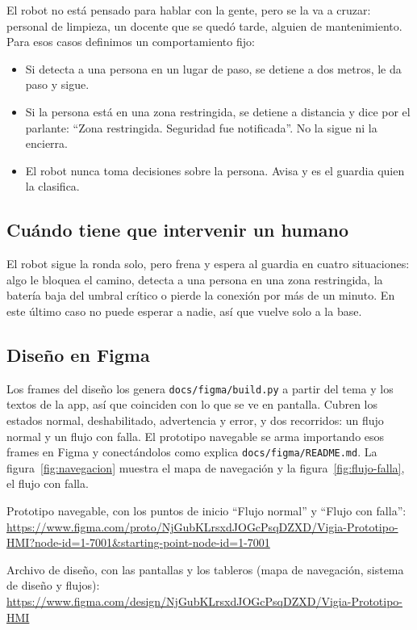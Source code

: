 El robot no está pensado para hablar con la gente, pero se la va a cruzar: personal de limpieza, un docente que se quedó tarde, alguien de mantenimiento. Para esos casos definimos un comportamiento fijo:

\begin{itemize}
  \item Si detecta a una persona en un lugar de paso, se detiene a dos metros, le da paso y sigue.
  \item Si la persona está en una zona restringida, se detiene a distancia y dice por el parlante: ``Zona restringida. Seguridad fue notificada''. No la sigue ni la encierra.
  \item El robot nunca toma decisiones sobre la persona. Avisa y es el guardia quien la clasifica.
\end{itemize}

\subsection{Cuándo tiene que intervenir un humano}

El robot sigue la ronda solo, pero frena y espera al guardia en cuatro situaciones: algo le bloquea el camino, detecta a una persona en una zona restringida, la batería baja del umbral crítico o pierde la conexión por más de un minuto. En este último caso no puede esperar a nadie, así que vuelve solo a la base.

\subsection{Diseño en Figma}
\label{sec:figma}

Los frames del diseño los genera \texttt{docs/figma/build.py} a partir del tema y los textos de la app, así que coinciden con lo que se ve en pantalla. Cubren los estados normal, deshabilitado, advertencia y error, y dos recorridos: un flujo normal y un flujo con falla. El prototipo navegable se arma importando esos frames en Figma y conectándolos como explica \texttt{docs/figma/README.md}. La figura~\ref{fig:navegacion} muestra el mapa de navegación y la figura~\ref{fig:flujo-falla}, el flujo con falla.

Prototipo navegable, con los puntos de inicio ``Flujo normal'' y ``Flujo con falla'': \url{https://www.figma.com/proto/NjGubKLrsxdJOGcPsqDZXD/Vigia-Prototipo-HMI?node-id=1-7001&starting-point-node-id=1-7001}

Archivo de diseño, con las pantallas y los tableros (mapa de navegación, sistema de diseño y flujos): \url{https://www.figma.com/design/NjGubKLrsxdJOGcPsqDZXD/Vigia-Prototipo-HMI}

